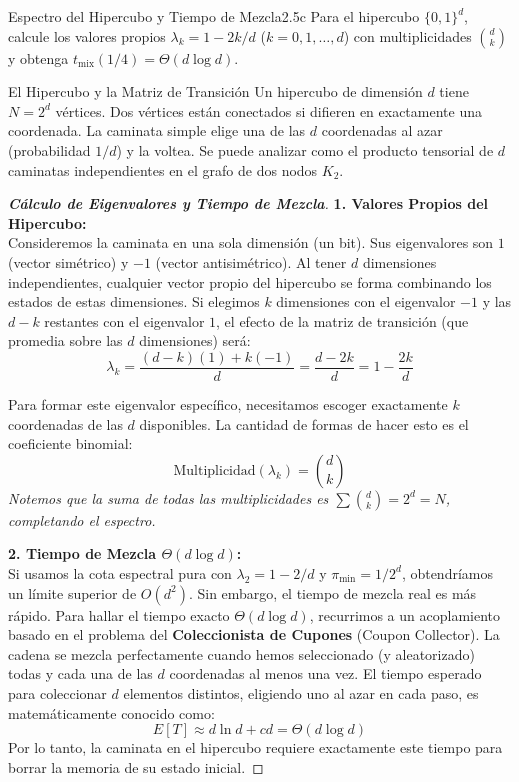\documentclass[10pt,a4paper]{article}
\begin{document}
\newpage

\begin{ejercicio}{Espectro del Hipercubo y Tiempo de Mezcla}{2.5c}
    Para el hipercubo $\{0,1\}^d$, calcule los valores propios $\lambda_k = 1 - 2k/d$ ($k=0,1,\dots,d$) con multiplicidades $\binom{d}{k}$ y obtenga $t_{\text{mix}}(1/4) = \Theta(d \log d)$.
\end{ejercicio}

\vspace{2mm}

\begin{nota}{El Hipercubo y la Matriz de Transición}
    Un hipercubo de dimensión $d$ tiene $N = 2^d$ vértices. Dos vértices están conectados si difieren en exactamente una coordenada. La caminata simple elige una de las $d$ coordenadas al azar (probabilidad $1/d$) y la voltea. 
    Se puede analizar como el producto tensorial de $d$ caminatas independientes en el grafo de dos nodos $K_2$.
\end{nota}

\begin{proof}[\textbf{Cálculo de Eigenvalores y Tiempo de Mezcla}]
    \textbf{1. Valores Propios del Hipercubo:} \\
    Consideremos la caminata en una sola dimensión (un bit). Sus eigenvalores son $1$ (vector simétrico) y $-1$ (vector antisimétrico).
    Al tener $d$ dimensiones independientes, cualquier vector propio del hipercubo se forma combinando los estados de estas dimensiones. Si elegimos $k$ dimensiones con el eigenvalor $-1$ y las $d-k$ restantes con el eigenvalor $1$, el efecto de la matriz de transición (que promedia sobre las $d$ dimensiones) será:
    \[ \lambda_k = \frac{(d-k)(1) + k(-1)}{d} = \frac{d - 2k}{d} = 1 - \frac{2k}{d} \]
    
    Para formar este eigenvalor específico, necesitamos escoger exactamente $k$ coordenadas de las $d$ disponibles. La cantidad de formas de hacer esto es el coeficiente binomial:
    \[ \text{Multiplicidad}(\lambda_k) = \binom{d}{k} \]
    \textit{Notemos que la suma de todas las multiplicidades es $\sum \binom{d}{k} = 2^d = N$, completando el espectro.}

    \textbf{2. Tiempo de Mezcla $\Theta(d \log d)$:} \\
    Si usamos la cota espectral pura con $\lambda_2 = 1 - 2/d$ y $\pi_{\min} = 1/2^d$, obtendríamos un límite superior de $O(d^2)$. Sin embargo, el tiempo de mezcla real es más rápido.
    Para hallar el tiempo exacto $\Theta(d \log d)$, recurrimos a un acoplamiento basado en el problema del \textbf{Coleccionista de Cupones} (Coupon Collector).
    La cadena se mezcla perfectamente cuando hemos seleccionado (y aleatorizado) todas y cada una de las $d$ coordenadas al menos una vez. 
    El tiempo esperado para coleccionar $d$ elementos distintos, eligiendo uno al azar en cada paso, es matemáticamente conocido como:
    \[ E[T] \approx d \ln d + c d = \Theta(d \log d) \]
    Por lo tanto, la caminata en el hipercubo requiere exactamente este tiempo para borrar la memoria de su estado inicial.
\end{proof}
\end{document}
